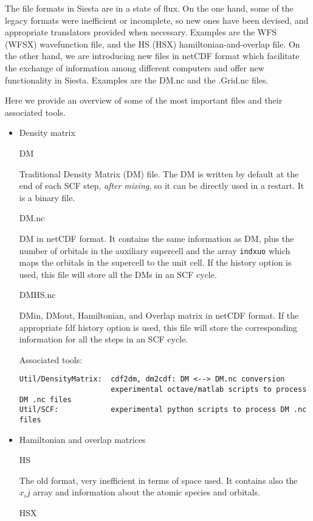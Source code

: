 \documentclass[11pt]{article}
\begin{document}
The file formats in Siesta are in a state of flux. On the one hand,
some of the legacy formats were inefficient or incomplete, so new ones
have been devised, and appropriate translators provided when
necessary.  Examples are the WFS (WFSX) wavefunction file, and the HS
(HSX) hamiltonian-and-overlap file. On the other hand, we are
introducing new files in netCDF format which facilitate the exchange
of information among different computers and offer new functionality
in Siesta. Examples are the DM.nc and the .Grid.nc files.

Here we provide an overview of some of the most important files and their
associated tools.

\begin{itemize}
\item{Density matrix}

DM 

Traditional Density Matrix (DM) file. The DM is written by default at
the end of each SCF step, {\em after mixing}, so it can be directly used
in a restart. It is a binary file.

DM.nc

DM in netCDF format. It contains the same information as DM, plus the
number of orbitals in the auxiliary supercell and the array {\tt indxuo}
which maps the orbitals in the supercell to the unit cell.  If the history
option is used, this file will store all the DMs in an SCF cycle.

DMHS.nc

DMin, DMout, Hamiltonian, and Overlap matrix in netCDF format. If the
appropriate fdf history option is used, this file will store the
corresponding information for all the steps in an SCF cycle.

Associated tools:

\begin{verbatim}
Util/DensityMatrix:  cdf2dm, dm2cdf: DM <--> DM.nc conversion
                     experimental octave/matlab scripts to process DM .nc files
Util/SCF:            experimental python scripts to process DM .nc files
\end{verbatim}

\item{Hamiltonian and overlap matrices}

HS

The old format, very inefficient in terms of space used. It contains
also the $x_ij$ array and information about the atomic species and orbitals.

HSX 


\end{itemize}
\end{document}
